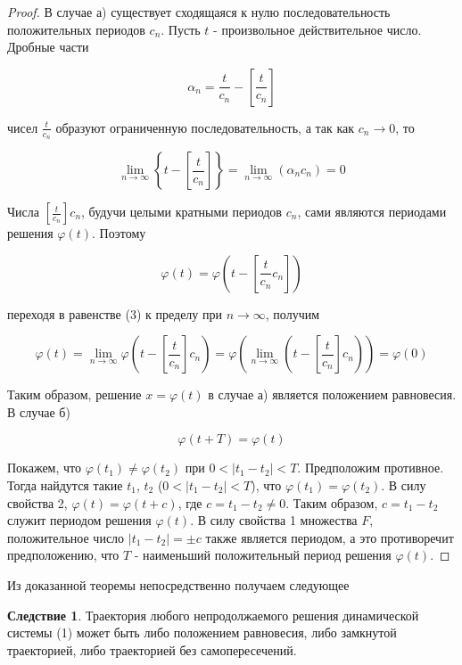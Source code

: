 \documentclass{article}
\theoremstyle{plain} \newtheorem*{theorem*}{Теорема}
\theoremstyle{plain} \newtheorem{theorem}{Теорема}[section]
\theoremstyle{definition} \newtheorem*{corollary*}{Следствие}
\theoremstyle{definition} \newtheorem{corollary}{Следствие}[section]
\begin{document}
\begin{proof}
    В случае а) существует сходящаяся к нулю
    последовательность положительных периодов $c_n$.
    Пусть $t$ - произвольное действительное число. Дробные части

    \begin{equation*}
        \alpha_n = \frac{t}{c_n} - \left[ \frac{t}{c_n} \right]
    \end{equation*}

    чисел $\frac{t}{c_n}$ образуют ограниченную
    последовательность, а так как $c_n \rightarrow 0$, то

    \begin{equation*}
        \lim_{n \rightarrow \infty}
        \left\{ t - \left[ \frac{t}{c_n}\right]\right\} =
        \lim_{n \rightarrow \infty} (\alpha_n c_n) = 0
    \end{equation*}

    Числа $\left[ \frac{t}{c_n} \right] c_n$,
    будучи целыми кратными периодов $c_n$,
    сами являются периодами решения $\varphi(t)$. Поэтому

    \begin{equation*}
        \varphi(t) =
        \varphi \left( t - \left[\frac{t}{c_n} c_n \right]\right)
    \end{equation*}

    переходя в равенстве (3) к пределу при
    $n \rightarrow \infty$, получим

    \begin{equation*}
        \varphi(t) =
        \lim_{n \rightarrow \infty} \varphi
        \left( t - \left[\frac{t}{c_n}\right] c_n \right) =
        \varphi \left( \lim_{n \rightarrow \infty}
        \left( t - \left[ \frac{t}{c_n} \right] c_n
        \right)\right) =
        \varphi(0)
    \end{equation*}

    Таким образом, решение $x = \varphi(t)$ в случае а)
    является положением равновесия.
\\

    В случае б)

    \begin{equation*}
        \varphi(t + T) = \varphi(t)
    \end{equation*}

    Покажем, что $\varphi(t_1) \ne \varphi(t_2)$
    при $0 < \vert t_1 - t_2 \vert < T$.
    Предположим противное. Тогда найдутся
    такие $t_1$, $t_2$ ($0 < \vert t_1 - t_2 \vert < T$),
    что $\varphi(t_1) = \varphi(t_2)$. В силу свойства 2,
    $ \varphi(t) = \varphi(t + c)$,
    где $c = t_1 - t_2 \ne 0$.
    Таким образом, $c = t_1 - t_2$ служит периодом
    решения $\varphi(t)$. В силу свойства 1
    множества $F$, положительное число
    $\vert t_1 - t_2 \vert = \pm c$ также является
    периодом, а это противоречит
    предположению, что $T$ - наименьший положительный
    период решения $\varphi(t)$.
\end{proof}

    Из доказанной теоремы непосредственно получаем следующее

    \begin{corollary*}
    Траектория любого непродолжаемого
    решения динамической системы (1) может быть либо
    положением равновесия, либо замкнутой
    траекторией, либо траекторией без самопересечений.
    \end{corollary*}
\end{document}
